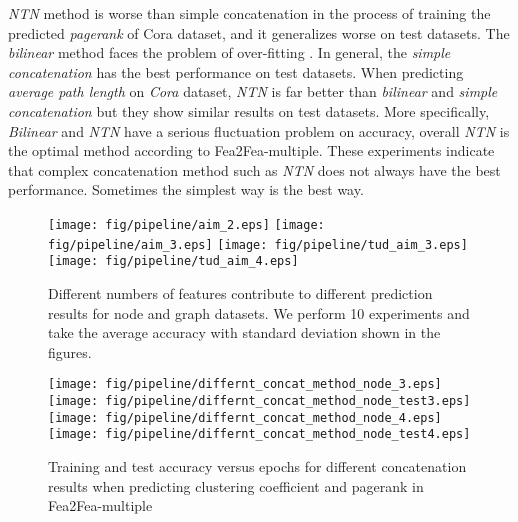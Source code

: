 \documentclass[runningheads]{llncs}
\newcommand{\xhdr}[1]{\vspace{1.7mm}\noindent{{\bf #1}}}
\begin{document}
  \xhdr{concatenation comparison}
\textit{NTN} method is worse than simple concatenation in the process of training 
the predicted \textit{pagerank} of Cora dataset, and it generalizes worse on test 
datasets. The \textit{bilinear} method faces the problem of over-fitting . In 
general, the \textit{simple concatenation} has the best performance on test 
datasets. When predicting \textit{average path length} on \textit{Cora} dataset, 
\textit{NTN} is far better than \textit{bilinear} and \textit{simple 
concatenation} but they show  similar results on test datasets. More specifically, 
\textit{Bilinear} and \textit{NTN} have a serious fluctuation problem on accuracy, 
overall \textit{NTN} is the optimal method according to Fea2Fea-multiple. These experiments indicate that 
complex concatenation method such as \textit{NTN} does not always have the best 
performance. Sometimes the simplest way is the best way.

  \begin{figure}[!h]
    \centering
    \begin{center}
    \hspace*{-1in}
        \texttt{[image: fig/pipeline/aim\_2.eps]}
        \texttt{[image: fig/pipeline/aim\_3.eps]}
        \texttt{[image: fig/pipeline/tud\_aim\_3.eps]}
        \texttt{[image: fig/pipeline/tud\_aim\_4.eps]}
        \hspace*{-1in}
        \caption{Different numbers of features contribute to different prediction 
  results for node and graph datasets. We perform 10 experiments and take the
  average accuracy with standard deviation shown in the figures.}
  
        
    \end{center}
    \end{figure}

    \begin{figure}[!htp]
  \centering
  \begin{center}
  \hspace*{-1in}
      \texttt{[image: fig/pipeline/differnt\_concat\_method\_node\_3.eps]}
      \texttt{[image: fig/pipeline/differnt\_concat\_method\_node\_test3.eps]}
      \texttt{[image: fig/pipeline/differnt\_concat\_method\_node\_4.eps]}
      \texttt{[image: fig/pipeline/differnt\_concat\_method\_node\_test4.eps]}
      \hspace*{-1in}
      \caption{Training and test accuracy versus epochs for different concatenation results when 
predicting clustering coefficient and pagerank in Fea2Fea-multiple}

      
  \end{center}
  \end{figure}
 
\end{document}
